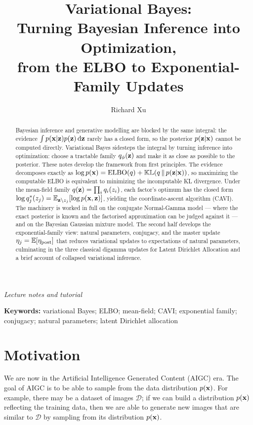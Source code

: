 \documentclass{article}
\title{\bfseries Variational Bayes:\\
Turning Bayesian Inference into Optimization,\\
from the ELBO to Exponential-Family Updates}
\author{Richard Xu}
\date{}
\begin{document}
\maketitle
\thispagestyle{plain}

\begin{center}
\textit{Lecture notes and tutorial}
\end{center}

\begin{abstract}
\noindent
Bayesian inference and generative modelling are blocked by the same integral:
the evidence $\int p({\mathbf x}|{\mathbf z})p({\mathbf z})\,\text{d}{\mathbf z}$ rarely has a closed form, so the
posterior $p({\mathbf z}|{\mathbf x})$ cannot be computed directly. Variational Bayes sidesteps
the integral by turning inference into optimization: choose a tractable family
$q_\phi({\mathbf z})$ and make it as close as possible to the posterior. These notes
develop the framework from first principles. The evidence decomposes exactly as
$\log p({\mathbf x}) = \text{ELBO}(q) + \mathbb{KL}(q\,\|\,p({\mathbf z}|{\mathbf x}))$, so maximizing the
computable ELBO is equivalent to minimizing the incomputable KL divergence.
Under the mean-field family $q({\mathbf z})=\prod_i q_i(z_i)$, each factor's optimum has
the closed form $\log q_j^*(z_j) = \mathbb{E}_{{\mathbf z}\setminus z_j}[\log p({\mathbf x},{\mathbf z})]$,
yielding the coordinate-ascent algorithm (CAVI). The machinery is worked in
full on the conjugate Normal-Gamma model --- where the exact posterior is known
and the factorised approximation can be judged against it --- and on the
Bayesian Gaussian mixture model. The second half develops the
exponential-family view: natural parameters, conjugacy, and the master update
$\eta_j = \mathbb{E}[\eta_{\text{post}}]$ that reduces variational updates to
expectations of natural parameters, culminating in the three classical digamma
updates for Latent Dirichlet Allocation and a brief account of collapsed
variational inference.
\end{abstract}

\vspace{2mm}
\noindent
\textbf{Keywords:} variational Bayes; ELBO; mean-field; CAVI; exponential
family; conjugacy; natural parameters; latent Dirichlet allocation

\newpage
\tableofcontents
\newpage

\section{Motivation}

We are now in the Artificial Intelligence Generated Content (AIGC) era. The goal of AIGC is to be able to sample from the data distribution $p({\mathbf x})$. For example, there may be a dataset of images $\mathcal{D}$; if we can build a distribution $p({\mathbf x})$ reflecting the training data, then we are able to generate new images that are similar to $\mathcal{D}$ by sampling from its distribution $p({\mathbf x})$.
\end{document}
